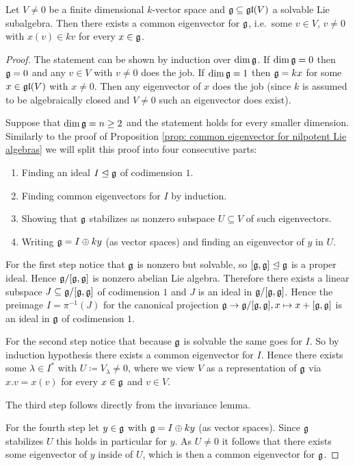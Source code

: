 \begin{thrm}[Lie]\label{thrm: Lie’s theorem}
 Let $V \neq 0$ be a finite dimensional $k$-vector space and $\mathfrak{g} \subseteq \mathfrak{gl}(V)$ a solvable Lie subalgebra. Then there exists a common eigenvector for $\mathfrak{g}$, i.e.\ some $v \in V$, $v \neq 0$ with $x(v) \in k v$ for every $x \in \mathfrak{g}$.
\end{thrm}
\begin{proof}
 The statement can be shown by induction over $\dim \mathfrak{g}$. If $\dim \mathfrak{g} = 0$ then $\mathfrak{g} = 0$ and any $v \in V$ with $v \neq 0$ does the job. If $\dim \mathfrak{g} = 1$ then $\mathfrak{g} = k x$ for some $x \in \mathfrak{gl}(V)$ with $x \neq 0$. Then any eigenvector of $x$ does the job (since $k$ is assumed to be algebraically closed and $V \neq 0$ such an eigenvector does exist).
 
 Suppose that $\dim \mathfrak{g} = n \geq 2$ and the statement holds for every smaller dimension. Similarly to the proof of Proposition \ref{prop: common eigenvector for nilpotent Lie algebras} we will split this proof into four consecutive parts:
 \begin{enumerate}
  \item
   Finding an ideal $I \trianglelefteq \mathfrak{g}$ of codimension $1$.
  \item
   Finding common eigenvectors for $I$ by induction.
  \item
   Showing that $\mathfrak{g}$ stabilizes as nonzero subspace $U \subseteq V$ of such eigenvectors.
  \item
   Writing $\mathfrak{g} = I \oplus k y$ (as vector spaces) and finding an eigenvector of $y$ in $U$.
 \end{enumerate}
 
 For the first step notice that $\mathfrak{g}$ is nonzero but solvable, so $[\mathfrak{g},\mathfrak{g}] \trianglelefteq \mathfrak{g}$ is a proper ideal. Hence $\mathfrak{g}/[\mathfrak{g},\mathfrak{g}]$ is nonzero abelian Lie algebra. Therefore there exists a linear subspace $J \subseteq \mathfrak{g}/[\mathfrak{g},\mathfrak{g}]$ of codimension $1$ and $J$ is an ideal in $\mathfrak{g}/[\mathfrak{g},\mathfrak{g}]$. Hence the preimage $I = \pi^{-1}(J)$ for the canonical projection $\mathfrak{g} \to \mathfrak{g}/[\mathfrak{g},\mathfrak{g}], x \mapsto x + [\mathfrak{g},\mathfrak{g}]$ is an ideal in $\mathfrak{g}$ of codimension $1$.
 
 For the second step notice that because $\mathfrak{g}$ is solvable the same goes for $I$. So by induction hypothesis there exists a common eigenvector for $I$. Hence there exists some $\lambda \in I^*$ with $U \coloneqq V_\lambda \neq 0$, where we view $V$ as a representation of $\mathfrak{g}$ via $x.v = x(v)$ for every $x \in \mathfrak{g}$ and $v \in V$.
 
 The third step follows directly from the invariance lemma.
 
 For the fourth step let $y \in \mathfrak{g}$ with $\mathfrak{g} = I \oplus k y$ (as vector spaces). Since $\mathfrak{g}$ stabilizes $U$ this holds in particular for $y$. As $U \neq 0$ it follows that there exists some eigenvector of $y$ inside of $U$, which is then a common eigenvector for $\mathfrak{g}$.
\end{proof}


